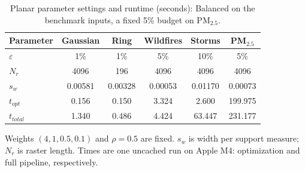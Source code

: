 \begin{table}[!ht]
\centering
\caption{Planar parameter settings and runtime (seconds): Balanced on the benchmark inputs, a fixed 5\% budget on PM$_{2.5}$.}
\label{tab:anchor-parameters-final}
\footnotesize
\setlength{\tabcolsep}{2pt}
\renewcommand{\arraystretch}{0.95}
\begin{tabular}{@{}lccccc@{}}
\toprule
Parameter & Gaussian & Ring & Wildfires & Storms & PM$_{2.5}$ \\
\midrule
$\varepsilon$ & 1\% & 1\% & 5\% & 10\% & 5\% \\
$N_r$ & 4096 & 196 & 4096 & 4096 & 4096 \\
$s_w$ & 0.00581 & 0.00328 & 0.00053 & 0.01170 & 0.00073 \\
$t_{opt}$ & 0.156 & 0.150 & 3.324 & 2.600 & 199.975 \\
$t_{total}$ & 1.340 & 0.486 & 4.424 & 63.447 & 231.177 \\
\bottomrule
\end{tabular}
\vspace{2pt}
\begin{minipage}{0.94\columnwidth}\footnotesize Weights $(4,1,0.5,0.1)$ and $\rho=0.5$ are fixed. $s_w$ is width per support measure; $N_r$ is raster length. Times are one uncached run on Apple M4: optimization and full pipeline, respectively.\end{minipage}
\end{table}

